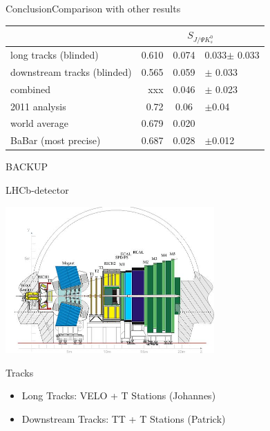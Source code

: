 \documentclass{beamer}
\newcommand{\SJPsi}{S_{J/\Psi K_s^0}}
\begin{document}
\begin{frame}{Conclusion}{Comparison with other results}
\begin{center}
\begin{tabular}{l r@{$\pm$}c@{}l}
\hline \hline
& \multicolumn{3}{c}{$\SJPsi$} \\ \hline
long tracks (blinded) & 0.610 & 0.074 & 0.033$\pm$ 0.033\\
downstream tracks (blinded) & 0.565 & 0.059 & $\pm$ 0.033\\ \hline
combined & xxx & 0.046&$\pm$ 0.023 \\ \hline
2011 analysis & 0.72 & 0.06 &$\pm$0.04\\
world average & 0.679 & 0.020 &\\
BaBar (most precise) & 0.687 & 0.028 &$\pm$0.012 \\ \hline \hline
\end{tabular}
\end{center}
\end{frame}

\begin{frame}
\begin{center}
BACKUP
\end{center}
\end{frame}

	
	\begin{frame}{LHCb-detector}
	\begin{center}
	\includegraphics[width = 0.6\textwidth]{detector}
	\end{center}
	\begin{block}{Tracks}
	\begin{itemize}
		\item Long Tracks: VELO + T Stations (Johannes)
		\item Downstream Tracks: TT + T Stations (Patrick)
	\end{itemize}
	\end{block}	
	\end{frame}
	
\end{document}
